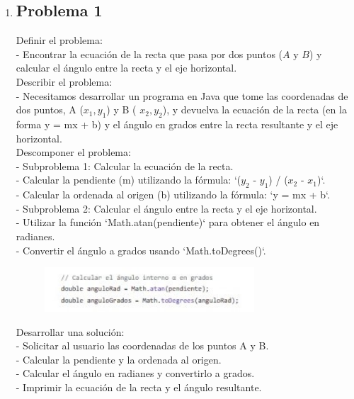 \documentclass{IEEEcsmag}
\begin{document}
\begin{enumerate}
\item \subsection{Problema 1}
    Definir el problema: \\
    - Encontrar la ecuación de la recta que pasa por dos puntos ($A \mbox{ y } B$) y calcular el ángulo entre la recta y el eje horizontal. \\
    Describir el problema: \\
    - Necesitamos desarrollar un programa en Java que tome las coordenadas de dos puntos, A ($x_{1}, y_{1}$) y B ( $x_{2}, y_{2}$), y devuelva la ecuación de la recta (en la forma y = mx + b) y el ángulo en grados entre la recta resultante y el eje horizontal. \\
    Descomponer el problema: \\
    - Subproblema 1: Calcular la ecuación de la recta. \\
    - Calcular la pendiente (m) utilizando la fórmula: `($y_{2}$ - $y_{1}$) / ($x_{2}$ - $x_{1}$)`. \\
    - Calcular la ordenada al origen (b) utilizando la fórmula: `y = mx + b`. \\
    
    - Subproblema 2: Calcular el ángulo entre la recta y el eje horizontal. \\
    - Utilizar la función `Math.atan(pendiente)` para obtener el ángulo en radianes.\\
    - Convertir el ángulo a grados usando `Math.toDegrees()`.\\
    
    \begin{figure}
    \centerline {\includegraphics[width=18.5pc]{./latex_imagenes/Img_ejer1_1.jpg}}
    \end{figure}
    
    Desarrollar una solución: \\
    - Solicitar al usuario las coordenadas de los puntos A y B. \\
    - Calcular la pendiente y la ordenada al origen. \\
    - Calcular el ángulo en radianes y convertirlo a grados. \\
    - Imprimir la ecuación de la recta y el ángulo resultante. \\


\end{enumerate}
\end{document}
